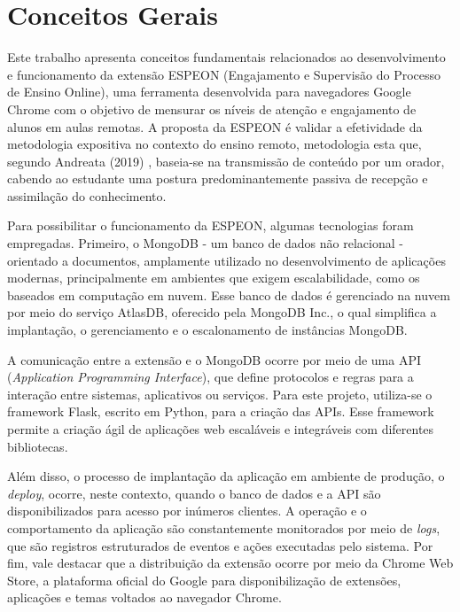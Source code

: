\section{Conceitos Gerais}\label{sec:concepts}
Este trabalho apresenta conceitos fundamentais relacionados ao desenvolvimento e funcionamento da extensão ESPEON (Engajamento e Supervisão do Processo de Ensino Online), uma ferramenta desenvolvida para navegadores Google Chrome com o objetivo de mensurar os níveis de atenção e engajamento de alunos em aulas remotas. A proposta da ESPEON é validar a efetividade da metodologia expositiva no contexto do ensino remoto, metodologia esta que, segundo Andreata (2019) \cite{ANDREATA2019}, baseia-se na transmissão de conteúdo por um orador, cabendo ao estudante uma postura predominantemente passiva de recepção e assimilação do conhecimento.

Para possibilitar o funcionamento da ESPEON, algumas tecnologias foram empregadas. Primeiro, o MongoDB - um banco de dados não relacional - orientado a documentos, amplamente utilizado no desenvolvimento de aplicações modernas, principalmente em ambientes que exigem escalabilidade, como os baseados em computação em nuvem. Esse banco de dados é gerenciado na nuvem por meio do serviço AtlasDB, oferecido pela MongoDB Inc., o qual simplifica a implantação, o gerenciamento e o escalonamento de instâncias MongoDB.

A comunicação entre a extensão e o MongoDB ocorre por meio de uma API (\textit{Application Programming Interface}), que define protocolos e regras para a interação entre sistemas, aplicativos ou serviços. Para este projeto, utiliza-se o framework Flask, escrito em Python, para a criação das APIs. Esse framework permite a criação ágil de aplicações web escaláveis e integráveis com diferentes bibliotecas. 

Além disso, o processo de implantação da aplicação em ambiente de produção, o \textit{deploy}, ocorre, neste contexto, quando o banco de dados e a API são disponibilizados para acesso por inúmeros clientes. A operação e o comportamento da aplicação são constantemente monitorados por meio de \textit{logs}, que são registros estruturados de eventos e ações executadas pelo sistema. Por fim, vale destacar que a distribuição da extensão ocorre por meio da Chrome Web Store, a plataforma oficial do Google para disponibilização de extensões, aplicações e temas voltados ao navegador Chrome.